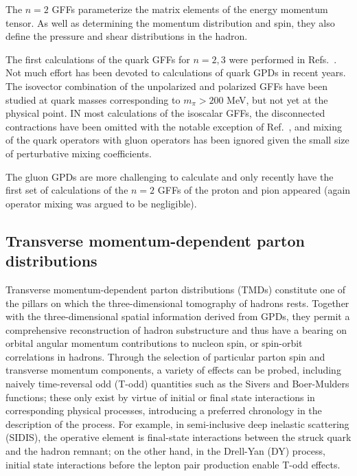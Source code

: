 The $n=2$ GFFs  parameterize the matrix elements of the energy momentum tensor. As well as determining the momentum distribution and spin, they 
also define the pressure and shear distributions in the hadron.

The first calculations of the quark GFFs for $n=2,3$ were performed in Refs.~\cite{FIXME}. Not much effort has been devoted to calculations of quark GPDs in recent years. The isovector combination of the unpolarized and polarized GFFs have been studied at quark masses corresponding to $m_\pi>200$ MeV, but not yet at the physical point. IN most calculations of the isoscalar GFFs, the disconnected contractions have been omitted with the notable exception of Ref.~\cite{Deka:2013zha}, and mixing of the quark operators with gluon operators has been ignored given the small size of perturbative mixing coefficients. 

The gluon GPDs are more challenging to calculate and only recently have the first set of calculations of the $n=2$ GFFs of the proton and pion appeared (again operator mixing was argued to be negligible).


\subsection{Transverse momentum-dependent parton distributions}



Transverse momentum-dependent parton distributions (TMDs) \cite{Boer:2011fh}
constitute one of the pillars on which the three-dimensional tomography of
hadrons rests. Together with the three-dimensional spatial information
derived from GPDs, they permit a
comprehensive reconstruction of hadron substructure and thus
have a bearing on %
orbital angular momentum contributions to nucleon spin, or
spin-orbit correlations in hadrons. Through the selection of
particular parton spin and transverse momentum components, a
variety of effects can be probed, including naively time-reversal odd
(T-odd) quantities such as the Sivers and Boer-Mulders functions;
these only exist by virtue of initial or final state interactions
in corresponding physical processes, introducing a preferred chronology
in the description of the process.
For example, in semi-inclusive
deep inelastic scattering (SIDIS), the operative element is final-state
interactions between the struck quark and the hadron remnant; on
the other hand, in the Drell-Yan (DY) process, initial state interactions
before the lepton pair production enable T-odd effects.

